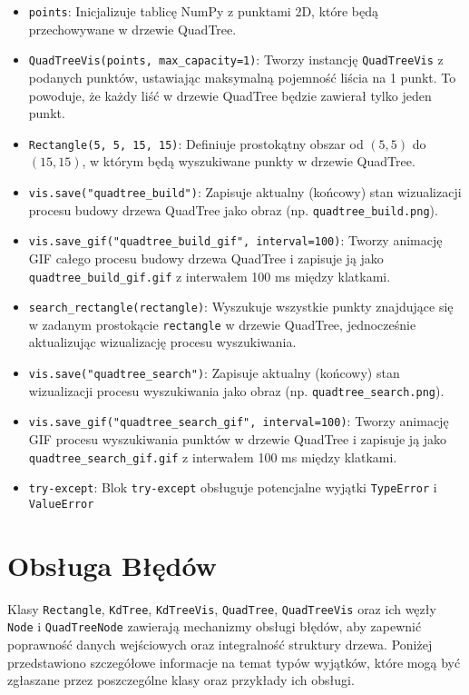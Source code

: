\documentclass[12pt]{article}
\begin{document}
\begin{itemize}
    \item \texttt{points}: Inicjalizuje tablicę NumPy z punktami 2D, które będą przechowywane w drzewie QuadTree.
    \item \texttt{QuadTreeVis(points, max\_capacity=1)}: Tworzy instancję \texttt{QuadTreeVis} z podanych punktów, ustawiając maksymalną pojemność liścia na 1 punkt. To powoduje, że każdy liść w drzewie QuadTree będzie zawierał tylko jeden punkt.
    \item \texttt{Rectangle(5, 5, 15, 15)}: Definiuje prostokątny obszar od \((5,5)\) do \((15,15)\), w którym będą wyszukiwane punkty w drzewie QuadTree.
    \item \texttt{vis.save("quadtree\_build")}: Zapisuje aktualny (końcowy) stan wizualizacji procesu budowy drzewa QuadTree jako obraz (np. \texttt{quadtree\_build.png}).
    \item \texttt{vis.save\_gif("quadtree\_build\_gif", interval=100)}: Tworzy animację GIF całego procesu budowy drzewa QuadTree i zapisuje ją jako \texttt{quadtree\_build\_gif.gif} z interwałem 100 ms między klatkami.
    \item \texttt{search\_rectangle(rectangle)}: Wyszukuje wszystkie punkty znajdujące się w zadanym prostokącie \texttt{rectangle} w drzewie QuadTree, jednocześnie aktualizując wizualizację procesu wyszukiwania.
    \item \texttt{vis.save("quadtree\_search")}: Zapisuje aktualny (końcowy) stan wizualizacji procesu wyszukiwania jako obraz (np. \texttt{quadtree\_search.png}).
    \item \texttt{vis.save\_gif("quadtree\_search\_gif", interval=100)}: Tworzy animację GIF procesu wyszukiwania punktów w drzewie QuadTree i zapisuje ją jako \texttt{quadtree\_search\_gif.gif} z interwałem 100 ms między klatkami. 
    \item \texttt{try-except}: Blok \texttt{try-except} obsługuje potencjalne wyjątki \texttt{TypeError} i \texttt{ValueError}
\end{itemize}


\section{Obsługa Błędów}

Klasy \texttt{Rectangle}, \texttt{KdTree}, \texttt{KdTreeVis}, \texttt{QuadTree}, \texttt{QuadTreeVis} oraz ich węzły \texttt{Node} i \texttt{QuadTreeNode} zawierają mechanizmy obsługi błędów, aby zapewnić poprawność danych wejściowych oraz integralność struktury drzewa. Poniżej przedstawiono szczegółowe informacje na temat typów wyjątków, które mogą być zgłaszane przez poszczególne klasy oraz przykłady ich obsługi.
\end{document}
